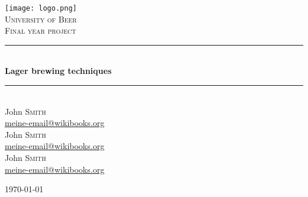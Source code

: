 \begin{titlepage}

\begin{center}

\texttt{[image: logo.png]}\\[1cm]    

\textsc{\LARGE University of Beer}\\[1.5cm]

\textsc{\Large Final year project}\\[0.5cm]


\newcommand{\HRule}{\rule{\linewidth}{0.5mm}}
\HRule \\[0.4cm]
{ \huge \bfseries Lager brewing techniques}\\[0.4cm]

\HRule \\[1.5cm]

John \textsc{Smith}\\ 
\href{mailto:meine-email@wikibooks.org}{meine-email@wikibooks.org}
\\[1\baselineskip]
John \textsc{Smith}\\ 
\href{mailto:meine-email@wikibooks.org}{meine-email@wikibooks.org}
\\[1\baselineskip]
John \textsc{Smith}\\ 
\href{mailto:meine-email@wikibooks.org}{meine-email@wikibooks.org}

 
\vfill

{\large \today}

\end{center}

\end{titlepage}